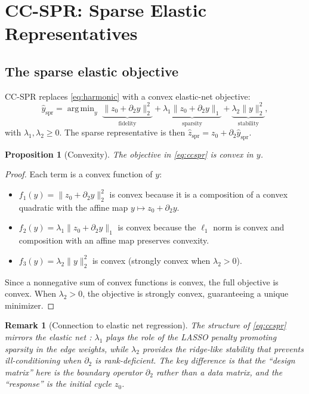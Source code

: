 \documentclass[11pt]{article}
\newtheorem{proposition}[theorem]{Proposition}
\newtheorem{remark}[theorem]{Remark}
\DeclareMathOperator*{\argmin}{arg\,min}
\begin{document}
\section{CC-SPR: Sparse Elastic Representatives}
\label{sec:sparse}

\subsection{The sparse elastic objective}

CC-SPR replaces \eqref{eq:harmonic} with a convex elastic-net objective:
\begin{equation}\label{eq:ccspr}
\hat{y}_{\mathrm{spr}} = \argmin_{y} \;\underbrace{\| z_0 + \partial_2 y \|_2^2}_{\text{fidelity}} + \underbrace{\lambda_1 \| z_0 + \partial_2 y \|_1}_{\text{sparsity}} + \underbrace{\lambda_2 \| y \|_2^2}_{\text{stability}},
\end{equation}
with $\lambda_1, \lambda_2 \ge 0$.
The sparse representative is then $\hat{z}_{\mathrm{spr}} = z_0 + \partial_2 \hat{y}_{\mathrm{spr}}$.

\begin{proposition}[Convexity]\label{prop:convex}
The objective in \eqref{eq:ccspr} is convex in $y$.
\end{proposition}

\begin{proof}
Each term is a convex function of $y$:
\begin{itemize}[leftmargin=1.5em]
\item $f_1(y) = \|z_0 + \partial_2 y\|_2^2$ is convex because it is a composition of a convex quadratic with the affine map $y \mapsto z_0 + \partial_2 y$.
\item $f_2(y) = \lambda_1 \|z_0 + \partial_2 y\|_1$ is convex because the $\ell_1$ norm is convex and composition with an affine map preserves convexity.
\item $f_3(y) = \lambda_2 \|y\|_2^2$ is convex (strongly convex when $\lambda_2 > 0$).
\end{itemize}
Since a nonnegative sum of convex functions is convex, the full objective is convex.
When $\lambda_2 > 0$, the objective is strongly convex, guaranteeing a unique minimizer.
\end{proof}

\begin{remark}[Connection to elastic net regression]
The structure of \eqref{eq:ccspr} mirrors the elastic net \cite{zou2005elasticnet}: $\lambda_1$ plays the role of the LASSO penalty promoting sparsity in the edge weights, while $\lambda_2$ provides the ridge-like stability that prevents ill-conditioning when $\partial_2$ is rank-deficient.
The key difference is that the ``design matrix'' here is the boundary operator $\partial_2$ rather than a data matrix, and the ``response'' is the initial cycle $z_0$.
\end{remark}
\end{document}
